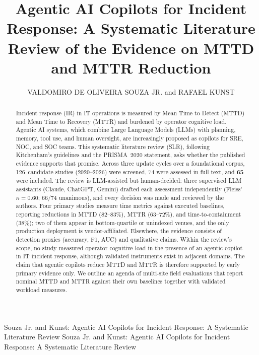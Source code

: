 \documentclass{ieeeaccess}
\makeatletter
\let\ieee@access@year\year
\def\year{\pdfprimitive\year}
\let\year\ieee@access@year
\makeatother
\begin{document}

\title{Agentic AI Copilots for Incident Response: A Systematic Literature
Review of the Evidence on MTTD and MTTR Reduction}

\author{\uppercase{Valdomiro de Oliveira Souza Jr.}
and \uppercase{Rafael Kunst}}

\address[1]{Applied Computing Graduate Program (PPGCA), Universidade do
Vale do Rio dos Sinos (Unisinos), S\~ao Leopoldo 93022-750, Brazil
(e-mail: valdomiro.souza@gmail.com, valdomiros@edu.unisinos.br;
rafaelkunst@unisinos.br)}

\markboth
{Souza Jr. and Kunst: Agentic AI Copilots for Incident Response: A Systematic Literature Review}
{Souza Jr. and Kunst: Agentic AI Copilots for Incident Response: A Systematic Literature Review}


\begin{abstract}
Incident response (IR) in IT operations is measured by Mean Time to Detect
(MTTD) and Mean Time to Recovery (MTTR) and burdened by operator cognitive
load. Agentic AI systems, which combine Large Language Models (LLMs) with
planning, memory, tool use, and human oversight, are increasingly proposed
as copilots for SRE, NOC, and SOC teams. This systematic literature review
(SLR), following Kitchenham's guidelines and the PRISMA~2020 statement,
asks whether the published evidence supports that promise. Across three
update cycles over a foundational corpus, 126~candidate studies
(2020--2026) were screened, 74 were assessed in full text, and
\textbf{65} were included. The review is LLM-assisted but human-decided:
three supervised LLM assistants (Claude, ChatGPT, Gemini) drafted each
assessment independently (Fleiss' $\kappa=0.60$; 66/74 unanimous), and
every decision was made and reviewed by the authors. Four primary studies
measure time metrics against executed baselines, reporting reductions in
MTTD (82--83\%), MTTR (63--72\%), and time-to-containment (38\%); two of
them appear in bottom-quartile or unindexed venues, and the only
production deployment is vendor-affiliated. Elsewhere, the evidence
consists of detection proxies (accuracy, F1, AUC) and qualitative claims.
Within the review's scope, no study measured operator cognitive load in
the presence of an agentic copilot in IT incident response, although
validated instruments exist in adjacent domains. The claim that agentic
copilots reduce MTTD and MTTR is therefore supported by early primary
evidence only. We outline an agenda of multi-site field evaluations that
report nominal MTTD and MTTR against their own baselines together with
validated workload measures.
\end{abstract}
\end{document}
